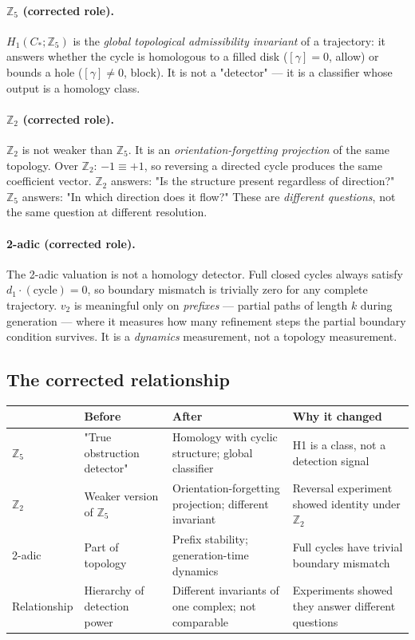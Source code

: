 \documentclass[11pt,a4paper]{article}
\begin{document}
\paragraph{$\mathbb{Z}_5$ (corrected role).}
$H_1(C_*;\mathbb{Z}_5)$ is the \emph{global topological admissibility
invariant} of a trajectory: it answers whether the cycle is homologous
to a filled disk ($[\gamma]=0$, allow) or bounds a hole
($[\gamma]\neq 0$, block).
It is not a "detector" --- it is a classifier whose output is
a homology class.

\paragraph{$\mathbb{Z}_2$ (corrected role).}
$\mathbb{Z}_2$ is not weaker than $\mathbb{Z}_5$.
It is an \emph{orientation-forgetting projection} of the same topology.
Over $\mathbb{Z}_2$: $-1 \equiv +1$, so reversing a directed cycle
produces the same coefficient vector.
$\mathbb{Z}_2$ answers: "Is the structure present regardless of direction?"
$\mathbb{Z}_5$ answers: "In which direction does it flow?"
These are \emph{different questions}, not the same question at different resolution.

\paragraph{2-adic (corrected role).}
The 2-adic valuation is not a homology detector.
Full closed cycles always satisfy $d_1 \cdot (\text{cycle}) = 0$,
so boundary mismatch is trivially zero for any complete trajectory.
$v_2$ is meaningful only on \emph{prefixes} --- partial paths
of length $k$ during generation --- where it measures how many
refinement steps the partial boundary condition survives.
It is a \emph{dynamics} measurement, not a topology measurement.

\subsection*{The corrected relationship}

\begin{center}
\renewcommand{\arraystretch}{1.3}\small
\begin{tabular}{p{2.5cm}p{3.2cm}p{3.2cm}p{3.2cm}}
\toprule
 & \textbf{Before} & \textbf{After} & \textbf{Why it changed} \\
\midrule
$\mathbb{Z}_5$ &
  "True obstruction detector" &
  Homology with cyclic structure; global classifier &
  H1 is a class, not a detection signal \\
$\mathbb{Z}_2$ &
  Weaker version of $\mathbb{Z}_5$ &
  Orientation-forgetting projection; different invariant &
  Reversal experiment showed identity under $\mathbb{Z}_2$ \\
2-adic &
  Part of topology &
  Prefix stability; generation-time dynamics &
  Full cycles have trivial boundary mismatch \\
Relationship &
  Hierarchy of detection power &
  Different invariants of one complex; not comparable &
  Experiments showed they answer different questions \\
\bottomrule
\end{tabular}
\end{center}
\end{document}
